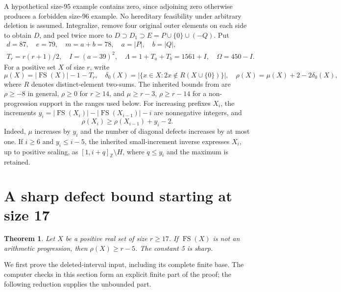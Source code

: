 \documentclass[11pt,a4paper]{article}
\newcommand{\FS}{\operatorname{FS}}
\newcommand{\Z}{\mathbb Z}
\newtheorem{theorem}{Theorem}[section]
\begin{document}
A hypothetical size-95 example contains zero, since adjoining zero
otherwise produces a forbidden size-96 example. No hereditary
feasibility under arbitrary deletion is assumed. Integralize, remove
four original outer elements on each side to obtain $D$, and peel twice
more to $D\supset D_1\supset E=P\cup\{0\}\cup(-Q)$. Put
\begin{gather*}
 d=87,\quad e=79,\quad m=a+b=78,\quad a=|P|,\quad b=|Q|,\\
 T_r=r(r+1)/2,\quad I=(a-39)^2,\quad
 \Lambda=1+T_a+T_b=1561+I,\quad\Omega=450-I.
\end{gather*}
For a positive set $X$ of size $r$, write
\[
 \mu(X)=|\FS(X)|-1-T_r,\quad
 \delta_0(X)=|\{x\in X:2x\notin R(X\cup\{0\})\}|,\quad
 \rho(X)=\mu(X)+2-2\delta_0(X),
\]
where $R$ denotes distinct-element two-sums. The inherited bounds from \cite{foundation} are
$\rho\ge-8$ in general, $\rho\ge0$ for $r\ge14$, and
$\mu\ge r-3$, $\rho\ge r-14$ for a non-progression support in the
ranges used below. For increasing prefixes $X_i$, the increments
$y_i=|\FS(X_i)|-|\FS(X_{i-1})|-i$ are nonnegative integers, and
\begin{equation}\label{recurrence}
 \rho(X_i)\ge\rho(X_{i-1})+y_i-2.
\end{equation}
Indeed, $\mu$ increases by $y_i$ and the number of diagonal defects
increases by at most one. If $i\ge6$ and $y_i\le i-5$, the inherited
small-increment inverse expresses $X_i$, up to positive scaling, as
$[1,i+q]_{\Z}\setminus H$, where $q\le y_i$ and the maximum is retained.

\section{A sharp defect bound starting at size 17}
\begin{theorem}\label{sharpnonap}
Let $X$ be a positive real set of size $r\ge17$. If $\FS(X)$ is not an
arithmetic progression, then $\rho(X)\ge r-5$. The constant 5 is sharp.
\end{theorem}
We first prove the deleted-interval input, including its complete finite
base. The computer checks in this section form an explicit finite part
of the proof; the following reduction supplies the unbounded part.
\end{document}
